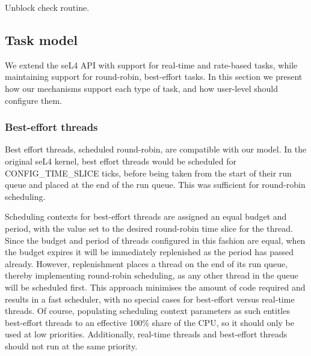 \begin{listing}
    \begin{ccode}
void unblock_check(sched_context_t *sc) {
  if (!head_refill(sc).time > now)) {
    return;
  }

  head_refill(sc).time = now;
  // merge available replenishments
  while (refill_size(sc) > 1) {
    if (refill_next(sc).time < now + head_refill(sc).amount) {
      refill_t old_head = pop_head(sc);
      head_refill(sc).amount += old_head.amount;
      head_refill(sc).time = now;
    } else {
      break;
    }

    if (head_refill(sc).amount < MIN_BUDGET) {
      // second part of split_check can leave refills
      // with less than MIN_BUDGET amount.
      // detect them here and merge.
      refill_t old_head = pop_head(sc);
      head_refill(sc).amount += old_head.amount;
    }
}
\end{ccode}
\caption{Unblock check routine.}
\label{list:unblock-check}
\end{listing}

\subsection{Task model}

We extend the seL4 API with support for real-time and rate-based tasks, while maintaining support for round-robin, best-effort tasks.
In this section we present how our mechanisms support each type of task, and how user-level should configure them.

\subsubsection{Best-effort threads}

Best effort threads, scheduled round-robin, are compatible with our model.
In the original seL4 kernel, best effort threads would be scheduled for CONFIG\_TIME\_SLICE ticks, before being taken from the start of their run queue and placed at the end of the run queue.
This was sufficient for round-robin scheduling.

Scheduling contexts for best-effort threads are assigned an equal budget and period, with the value set to the desired round-robin time slice for the thread.
Since the budget and period of threads configured in this fashion are equal, when the budget expires it will be immediately replenished as the period has passed already.
However, replenishment places a thread on the end of its run queue, thereby implementing round-robin scheduling, as any other thread in the queue will be scheduled first.
This approach minimises the amount of code required and results in a fast scheduler, with no special cases for best-effort versus real-time threads.
Of course, populating scheduling context parameters as such entitles best-effort threads to an effective 100\% share of the CPU, so it should only be used at low priorities.
Additionally, real-time threads and best-effort threads should not run at the same priority.


